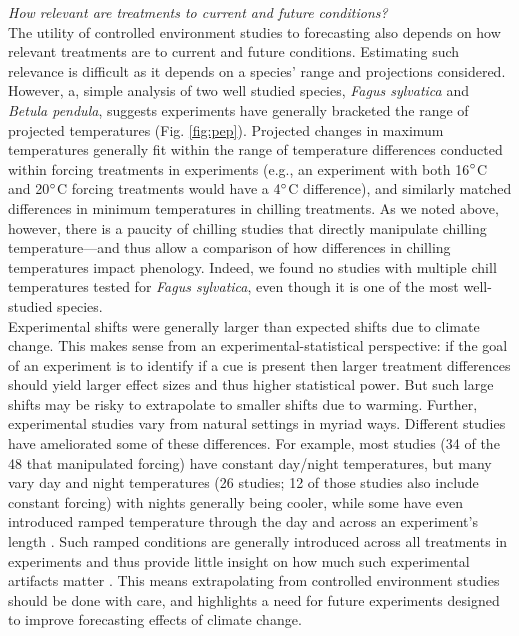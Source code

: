 \documentclass[11pt,letter]{article}
\begin{document}
\emph{How relevant are treatments to current and future conditions?}\\
The utility of controlled environment studies to forecasting also depends on how relevant treatments are to current and future conditions. Estimating such relevance is difficult as it depends on a species' range and projections considered. However, a, simple analysis of two well studied species, \emph{Fagus sylvatica} and \emph{Betula pendula}, suggests experiments have generally bracketed the range of projected temperatures (Fig. \ref{fig:pep}). Projected changes in maximum temperatures generally fit within the range of temperature differences conducted within forcing treatments in experiments (e.g., an experiment with both 16$\degree$C  and 20$\degree$C forcing treatments would have a 4$\degree$C difference), and similarly matched differences in minimum temperatures in chilling treatments. As we noted above, however, there is a paucity of chilling studies that directly manipulate chilling temperature---and thus allow a comparison of how differences in chilling temperatures impact phenology. Indeed, we found no studies with multiple chill temperatures tested for \emph{Fagus sylvatica}, even though it is one of the most well-studied species. \\

Experimental shifts were generally larger than expected shifts due to climate change. This makes sense from an experimental-statistical perspective: if the goal of an experiment is to identify if a cue is present then larger treatment differences should yield larger effect sizes and thus higher statistical power. But such large shifts may be risky to extrapolate to smaller shifts due to warming. Further, experimental studies vary from natural settings in myriad ways. Different studies have ameliorated some of these differences. For example, most studies (34 of the 48 that manipulated forcing) have constant day/night temperatures, but many vary day and night temperatures (26 studies; 12 of those studies also include constant forcing) with nights generally being cooler, while some have even introduced ramped temperature through the day and across an experiment's length \citep[e.g.,][]{Basler:2012,Laube:2014a}. Such ramped conditions are generally introduced across all treatments in experiments and thus provide little insight on how much such experimental artifacts matter \citep[but see][]{erwin1995}. This means extrapolating from controlled environment studies should be done with care, and highlights a need for future experiments designed to improve forecasting effects of climate change. 
\end{document}
